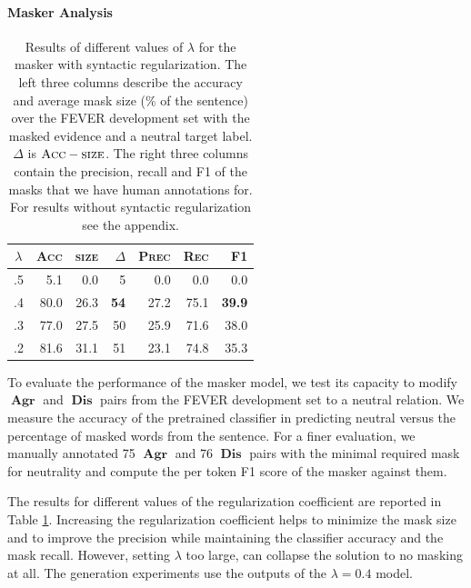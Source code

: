 \documentclass[letterpaper]{article} %
\DeclareMathOperator{\A}{\boldsymbol{Agr}}
\DeclareMathOperator{\D}{\boldsymbol{Dis}}
\begin{document}
\paragraph{Masker Analysis}

\begin{table}[t]
\centering
\begin{tabular}{c|rrr|rrr}
\toprule
$\lambda$ & \textsc{Acc} & \textsc{size} & $\Delta$ & \textsc{Prec} & \textsc{Rec} & \textsc{F1}   \\ \midrule
.5 & 5.1      & 0.0         & 5   & 0.0    & 0.0      & 0.0    \\
.4 & 80.0       & 26.3      & \textbf{54}  & 27.2 & 75.1   & \textbf{39.9} \\
.3 & 77.0       & 27.5      & 50  & 25.9 & 71.6   & 38.0   \\
.2 & 81.6     & 31.1      & 51  & 23.1 & 74.8   & 35.3 \\
\bottomrule
\end{tabular}
\caption{Results of different values of $\lambda$ for the masker with syntactic regularization. The left three columns describe the accuracy and average mask size (\% of the sentence) over the FEVER development set with the masked evidence and a neutral target label. $\Delta$ is $\textsc{Acc}-\textsc{size}$. The right three columns contain the precision, recall and F1 of the masks that we have human annotations for. For results without syntactic regularization see the appendix.}
\label{tab:mask_res}
\end{table}


To evaluate the performance of the masker model, we test its capacity to modify $\A$ and $\D$ pairs from the FEVER development set to a neutral relation. We measure the accuracy of the pretrained classifier in predicting neutral versus the percentage of masked words from the sentence. For a finer evaluation, we manually annotated 75 $\A$ and 76 $\D$ pairs with the minimal required mask for neutrality and compute the per token \textsc{F1} score of the masker against them.

The results for different values of the regularization coefficient are reported in Table \ref{tab:mask_res}. Increasing the regularization coefficient helps to minimize the mask size and to improve the precision while maintaining the classifier accuracy and the mask recall. However, setting $\lambda$ too large, can collapse the solution to no masking at all. The generation experiments use the outputs of the $\lambda=0.4$ model.
\end{document}
